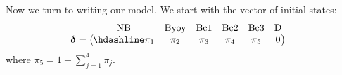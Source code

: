 \documentclass[
  12pt,
]{krantz}
\begin{document}
Now we turn to writing our model. We start with the vector of initial states:
\[
\begin{matrix}
& \\
\boldsymbol{\delta} =
\left ( \vphantom{ \begin{matrix} 1 \end{matrix} } \right .
\end{matrix}
\hspace{-1.2em}
\begin{matrix}
\text{NB} & \text{Byoy} & \text{Bc1} & \text{Bc2} & \text{Bc3} & \text{D} \\ \hdashline
\pi_1 & \pi_2 & \pi_3 & \pi_4 & \pi_5 & 0
\end{matrix}
\hspace{-0.2em}
\begin{matrix}
& \\
\left . \vphantom{ \begin{matrix} 1 \end{matrix} } \right )
\end{matrix}
\]
where \(\displaystyle \pi_5 = 1 - \sum_{j=1}^4\pi_j\).
\end{document}
